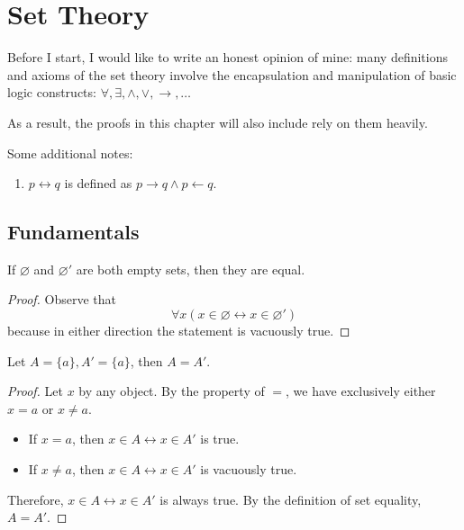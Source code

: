 
\chapter{Set Theory}
Before I start, I would like to write an honest opinion of mine: many definitions and axioms of the set theory involve the encapsulation and manipulation of basic logic constructs: $\forall, \exists, \wedge, \vee, \to, \dots$

As a result, the proofs in this chapter will also include rely on them heavily.

Some additional notes:
\begin{enumerate}
	\item $p \leftrightarrow q$ is defined as $p \to q \wedge p \leftarrow q$.
\end{enumerate}

\section{Fundamentals}
\begin{why}{29}\label{why.unique.empty.set}
If $\varnothing$ and $\varnothing'$ are both empty sets, then they are equal.
\end{why}
\begin{proof}
	Observe that 
	\[
	\forall x (x \in \varnothing \leftrightarrow x \in \varnothing')
	\]
	because in either direction the statement is vacuously true.
\end{proof}

\begin{why}{30}
	Let $A = \{a\}, A' = \{a\}$, then $A = A'$.
\end{why}
\begin{proof}
	Let $x$ by any object. By the property of $=$, we have exclusively either $x=a$ or $x \ne a$.
	
	\begin{itemize}
		\item If $x = a$, then $x \in A \leftrightarrow x \in A'$ is true.
		\item If $x \ne a$, then $x \in A \leftrightarrow x \in A'$ is vacuously true.		
	\end{itemize}

	Therefore, $x \in A \leftrightarrow x \in A'$ is always true. By the definition of set equality, $A = A'$.
\end{proof}

